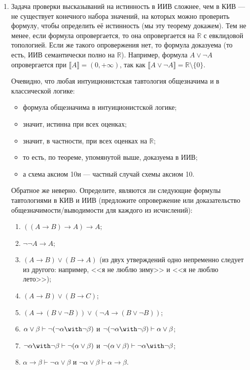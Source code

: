 \documentclass[10pt,a4paper,oneside]{article}
\begin{document}
\begin{enumerate}
\item Задача проверки высказываний на истинность в ИИВ сложнее, чем в КИВ --- не существует конечного набора значений,
на которых можно проверить формулу, чтобы определить её истинность (мы эту теорему докажем). Тем не менее, если формула
опровергается, то она опровергается на $\mathbb{R}$ с евклидовой топологией. Если же такого опровержения нет, то формула 
доказуема (то есть, ИИВ семантически полно на $\mathbb{R}$). Например, формула $A \vee \neg A$ опровергается при $\llbracket A \rrbracket = (0,+\infty)$,
так как $\llbracket A \vee \neg A \rrbracket = \mathbb{R}\setminus\{0\}$.

Очевидно, что любая интуиционистская тавтология общезначима и в классической логике:
\begin{itemize}
\item формула общезначима в интуиционистской логике; 
\item значит, истинна при всех оценках; 
\item значит, в частности, при всех оценках на $\mathbb{R}$;
\item то есть, по теореме, упомянутой выше, доказуема в ИИВ;
\item а схема аксиом 10и --- частный случай схемы аксиом 10.
\end{itemize}
Обратное же неверно. Определите, являются ли следующие формулы тавтологиями в КИВ и ИИВ (предложите опровержение или доказательство общезначимости/выводимости для каждого
из исчислений):

\begin{enumerate}
\item $((A \rightarrow B) \rightarrow A) \rightarrow A$;
\item $\neg\neg A \rightarrow A$;
\item $(A \rightarrow B) \vee (B \rightarrow A)$ (из двух утверждений одно непременно следует из другого: например, <<я не люблю зиму>> и <<я не люблю лето>>);
\item $(A \rightarrow B) \vee (B \rightarrow C)$;
\item $(A \rightarrow (B \vee \neg B)) \vee (\neg A \rightarrow (B \vee \neg B))$;
\item $\alpha\vee\beta \vdash \neg(\neg\alpha\with\neg\beta)$ и $\neg(\neg\alpha\with\neg\beta) \vdash \alpha\vee\beta$;
\item $\neg\alpha\with\neg\beta \vdash \neg(\alpha\vee\beta)$ и $\neg(\alpha\vee\beta) \vdash \neg\alpha\with\neg\beta$;
\item $\alpha\rightarrow\beta \vdash \neg\alpha\vee\beta$ и $\neg\alpha\vee\beta \vdash \alpha\rightarrow\beta$.
\end{enumerate}


\end{enumerate}
\end{document}
